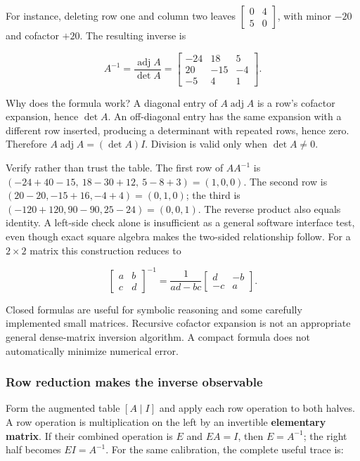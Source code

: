 For instance, deleting row one and column two leaves \(\begin{bmatrix}0&4\\5&0\end{bmatrix}\), with minor \(-20\) and cofactor \(+20\). The resulting inverse is

\[
A^{-1}=\frac{\operatorname{adj}A}{\det A}
=\begin{bmatrix}-24&18&5\\20&-15&-4\\-5&4&1\end{bmatrix}.
\]

Why does the formula work? A diagonal entry of \(A\operatorname{adj}A\) is a row's cofactor expansion, hence \(\det A\). An off-diagonal entry has the same expansion with a different row inserted, producing a determinant with repeated rows, hence zero. Therefore \(A\operatorname{adj}A=(\det A)I\). Division is valid only when \(\det A\ne0\).

Verify rather than trust the table. The first row of \(AA^{-1}\) is \((-24+40-15,\ 18-30+12,\ 5-8+3)=(1,0,0)\). The second row is \((20-20,-15+16,-4+4)=(0,1,0)\); the third is \((-120+120,90-90,25-24)=(0,0,1)\). The reverse product also equals identity. A left-side check alone is insufficient as a general software interface test, even though exact square algebra makes the two-sided relationship follow. For a \(2\times2\) matrix this construction reduces to

\[
\begin{bmatrix}a&b\\c&d\end{bmatrix}^{-1}
=\frac1{ad-bc}\begin{bmatrix}d&-b\\-c&a\end{bmatrix}.
\]

Closed formulas are useful for symbolic reasoning and some carefully implemented small matrices. Recursive cofactor expansion is not an appropriate general dense-matrix inversion algorithm. A compact formula does not automatically minimize numerical error.

\subsubsection{Row reduction makes the inverse observable}\label{01-foundations-i-ch018-row-reduction-makes-the-inverse-observable}

Form the augmented table \([A\mid I]\) and apply each row operation to both halves. A row operation is multiplication on the left by an invertible \textbf{elementary matrix}. If their combined operation is \(E\) and \(EA=I\), then \(E=A^{-1}\); the right half becomes \(EI=A^{-1}\). For the same calibration, the complete useful trace is:

